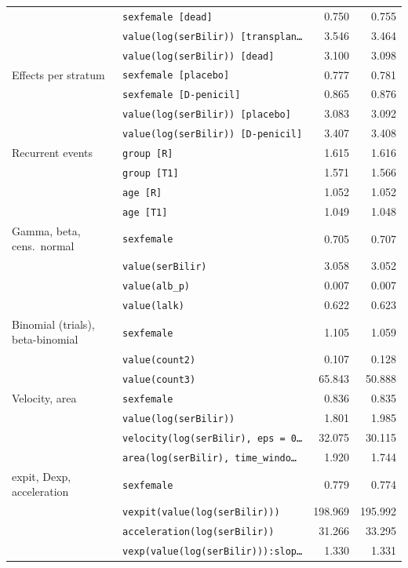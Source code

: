 \begin{longtable}{llrr}
 & \texttt{sexfemale [dead]} & 0.750 & 0.755 \\
 & \texttt{value(log(serBilir)) [transplan\ldots} & 3.546 & 3.464 \\
 & \texttt{value(log(serBilir)) [dead]} & 3.100 & 3.098 \\
\addlinespace
Effects per stratum & \texttt{sexfemale [placebo]} & 0.777 & 0.781 \\
 & \texttt{sexfemale [D-penicil]} & 0.865 & 0.876 \\
 & \texttt{value(log(serBilir)) [placebo]} & 3.083 & 3.092 \\
 & \texttt{value(log(serBilir)) [D-penicil]} & 3.407 & 3.408 \\
\addlinespace
Recurrent events & \texttt{group [R]} & 1.615 & 1.616 \\
 & \texttt{group [T1]} & 1.571 & 1.566 \\
 & \texttt{age [R]} & 1.052 & 1.052 \\
 & \texttt{age [T1]} & 1.049 & 1.048 \\
\addlinespace
Gamma, beta, cens.\ normal & \texttt{sexfemale} & 0.705 & 0.707 \\
 & \texttt{value(serBilir)} & 3.058 & 3.052 \\
 & \texttt{value(alb\_p)} & 0.007 & 0.007 \\
 & \texttt{value(lalk)} & 0.622 & 0.623 \\
\addlinespace
Binomial (trials), beta-binomial & \texttt{sexfemale} & 1.105 & 1.059 \\
 & \texttt{value(count2)} & 0.107 & 0.128 \\
 & \texttt{value(count3)} & 65.843 & 50.888 \\
\addlinespace
Velocity, area & \texttt{sexfemale} & 0.836 & 0.835 \\
 & \texttt{value(log(serBilir))} & 1.801 & 1.985 \\
 & \texttt{velocity(log(serBilir), eps = 0\ldots} & 32.075 & 30.115 \\
 & \texttt{area(log(serBilir), time\_windo\ldots} & 1.920 & 1.744 \\
\addlinespace
expit, Dexp, acceleration & \texttt{sexfemale} & 0.779 & 0.774 \\
 & \texttt{vexpit(value(log(serBilir)))} & 198.969 & 195.992 \\
 & \texttt{acceleration(log(serBilir))} & 31.266 & 33.295 \\
 & \texttt{vexp(value(log(serBilir))):slop\ldots} & 1.330 & 1.331 \\

\end{longtable}
